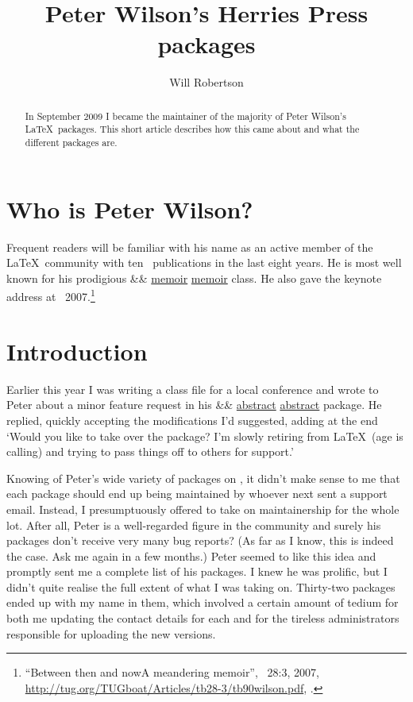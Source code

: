 \documentclass[final]{ltugboat}
\title{Peter Wilson's Herries Press packages}
\author{Will Robertson}
\newcommand\pkg[2][]{%
  \ifx&#1&%
    \href{http://tug.ctan.org/pkg/#2}{\textsf{#2}}%
  \else
    \href{http://tug.ctan.org/pkg/#1}{\textsf{#2}}%
  \fi
}
\begin{document}
\maketitle
\begin{abstract}
In September 2009 I became the maintainer of the majority of Peter Wilson's \LaTeX\ packages. This short article describes how this came about and what the different packages are.
\end{abstract}

\section{Who is Peter Wilson?}

Frequent readers will be familiar with his name as an active member of the \LaTeX\ community with ten \TUB\ publications in the last eight years. He is most well known for his prodigious \pkg{memoir} class. He also gave the keynote address at ~2007.\footnote{%
``Between then and now\Dash A meandering memoir'', \TUB\ 28:3, 2007, \url{http://tug.org/TUGboat/Articles/tb28-3/tb90wilson.pdf},
.}

\section{Introduction}

Earlier this year I was writing a class file for a local conference and wrote to Peter about a minor feature request in his \pkg{abstract} package. He replied, quickly accepting the modifications I'd suggested, adding at the end `{Would you like to take over the package? I'm slowly retiring from \LaTeX\ (age is calling) and trying to pass things off to others for support.}'

Knowing of Peter's wide variety of packages on , it didn't make sense to me that each package should end up being maintained by whoever next sent a support email. Instead, I presumptuously offered to take on maintainership for the whole lot. After all, Peter is a well-regarded figure in the community and surely his packages don't receive very many bug reports? (As far as I know, this is indeed the case. Ask me again in a few months.) Peter seemed to like this idea and promptly sent me a complete list of his packages. I knew he was prolific, but I didn't quite realise the full extent of what I was taking on. Thirty-two packages ended up with my name in them, which involved a certain amount of tedium for both me updating the contact details for each and for the tireless  administrators responsible for uploading the new versions.
\end{document}
